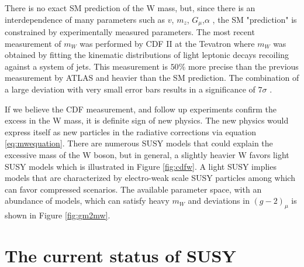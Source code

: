 There is no exact SM prediction of the W mass, but, since there is an interdependence of many parameters such as $v$, $m_z$, $G_\mu$,$\alpha$ , the SM "prediction" is constrained by experimentally measured parameters. The most recent measurement of $m_W$ was performed by CDF II at the Tevatron where $m_W$ was obtained by fitting the kinematic distributions of light leptonic decays recoiling against a system of jets. This measurement is $50\%$ more precise than the previous measurement by ATLAS and heavier than the SM prediction. The combination of a large deviation with very small error bars results in a significance of $7\sigma$ \cite{CDF:2022hxs}.  

If we believe the CDF measurement, and follow up experiments confirm the excess in the W mass, it is definite sign of new physics. The new physics would express itself as new particles in the radiative corrections via equation \ref{eq:mwequation}. There are numerous SUSY models that could explain the excessive mass of the W boson, but in general, a slightly heavier W favors light SUSY models which is illustrated in Figure \ref{fig:cdfw}. A light SUSY implies models that are characterized by electro-weak scale SUSY particles among which  can favor compressed scenarios. The available parameter space, with an abundance of models,  which can satisfy heavy $m_W$ and deviations in $(g-2)_\mu$ is shown in Figure \ref{fig:gm2mw}.
\section{The current status of SUSY}

